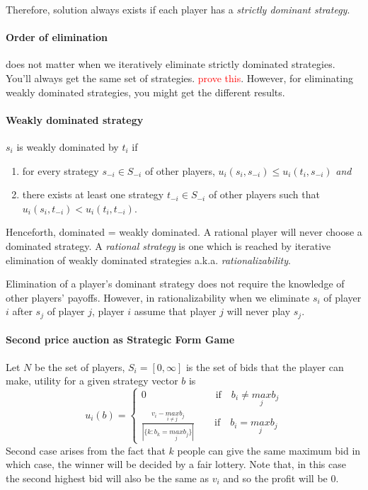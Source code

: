 Therefore, solution always exists if each player has a \textit{strictly dominant strategy}.

\paragraph{Order of elimination} does not matter when we iteratively eliminate strictly dominated strategies. You'll always get the same set of strategies. \textcolor{red}{prove this}. However, for eliminating weakly dominated strategies, you might get the different results.

\paragraph{Weakly dominated strategy} $s_i$ is weakly dominated by $t_i$ if 
\begin{enumerate}
	\item for every strategy $s_{-i} \in S_{-i}$ of other players, $u_i(s_i, s_{-i}) \leq u_i(t_i, s_{-i})$ \textit{and}
	\item there exists at least one strategy $t_{-i} \in S_{-i}$ of other players such that $u_i(s_i, t_{-i}) < u_i(t_i, t_{-i})$.
\end{enumerate}

Henceforth, dominated = weakly dominated. A rational player will never choose a dominated strategy. A \textit{rational strategy} is one which is reached by iterative elimination of weakly dominated strategies a.k.a. \textit{rationalizability}. 

Elimination of a player's dominant strategy does not require the knowledge of other players' payoffs. However, in rationalizability when we eliminate $s_i$ of player $i$ after $s_j$ of player $j$, player $i$ assume that player $j$ will never play $s_j$.

\paragraph{Second price auction as Strategic Form Game} Let $N$ be the set of players, $S_i = [0, \infty]$ is the set of bids that the player can make, utility for a given strategy vector $b$ is 
\[
u_i(b) = 
\begin{cases}
0 \quad \quad \quad \quad \quad \quad \quad \text{if} \quad b_i \neq \underset{j}{max}b_j\\
\frac{v_i - \underset{i \neq j}{max}b_j}{|\{k: b_k = \underset{j}{max}b_j\}|} \quad \quad \text{if} \quad b_i = \underset{j}{max}b_j
\end{cases}
\]
Second case arises from the fact that $k$ people can give the same maximum bid in which case, the winner will be decided by a fair lottery. Note that, in this case the second highest bid will also be the same as $v_i$ and so the profit will be 0.

